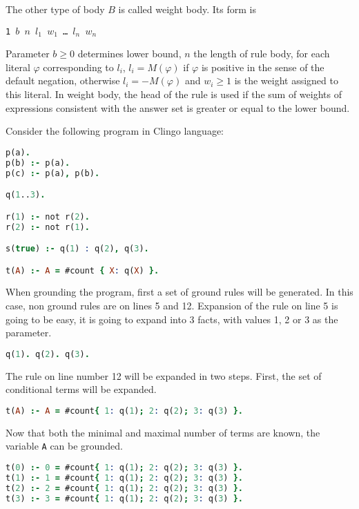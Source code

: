 The other type of body $B$ is called weight body. Its form is
\begin{center}
    \texttt{1 $b$ $n$ $l_1$ $w_1$ \dots{}  $l_n$ $w_n$}
\end{center}
Parameter $b\geq 0$ determines lower bound, $n$
the length of rule body, for each literal $\varphi$ corresponding to $l_i$,
$l_i = M(\varphi)$ if $\varphi$ is positive in the sense of
the default negation, otherwise $l_i = -M(\varphi)$
and $w_i\geq 1$ is the weight assigned to this literal.
In weight body, the head of the rule is used if the sum of weights of expressions
consistent with the answer set is greater or equal to the lower bound.

\begin{example}\label{exp:gringo_grounding}
    Consider the following program in Clingo language:
    \begin{lstlisting}[language=prolog]
p(a).
p(b) :- p(a).
p(c) :- p(a), p(b).

q(1..3).

r(1) :- not r(2).
r(2) :- not r(1).

s(true) :- q(1) : q(2), q(3).

t(A) :- A = #count { X: q(X) }.
\end{lstlisting}

    When grounding the program, first a set of ground rules will be generated.
    In this case, non ground rules are on lines 5 and 12. Expansion of the rule
    on line 5 is going to be easy, it is going to expand into 3 facts,
    with values 1, 2 or 3 as the parameter.
    \begin{lstlisting}[language=prolog, firstnumber=5]
q(1). q(2). q(3).
\end{lstlisting}
    The rule on line number 12 will be expanded in two steps. First, the set of
    conditional terms will be expanded.
    \begin{lstlisting}[language=prolog, firstnumber=12]
t(A) :- A = #count{ 1: q(1); 2: q(2); 3: q(3) }.
\end{lstlisting}
	Now that both the minimal and maximal number of terms are known, the variable
    \texttt{A} can be grounded.
    \begin{lstlisting}[language=prolog, firstnumber=12]
t(0) :- 0 = #count{ 1: q(1); 2: q(2); 3: q(3) }.
t(1) :- 1 = #count{ 1: q(1); 2: q(2); 3: q(3) }.
t(2) :- 2 = #count{ 1: q(1); 2: q(2); 3: q(3) }.
t(3) :- 3 = #count{ 1: q(1); 2: q(2); 3: q(3) }.
\end{lstlisting}


\end{example}
